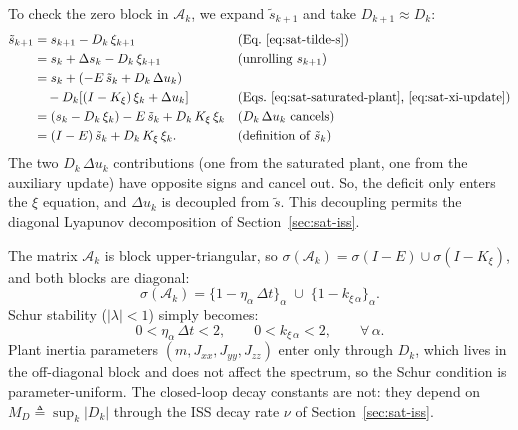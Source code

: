 \documentclass[conf]{new-aiaa}
\begin{document}
To check the zero block in $\mathcal{A}_k$, we expand $\tilde s_{k+1}$ and take $D_{k+1} \approx D_k$:
\small
\begingroup
\setlength{\jot}{1pt}
\begin{align}
\tilde s_{k+1}
&= s_{k+1} - D_k\, \xi_{k+1}
& &\text{(Eq.~\ref{eq:sat-tilde-s})} \notag \\
&= s_k + \Delta s_k - D_k\, \xi_{k+1}
& &\text{(unrolling $s_{k+1}$)} \notag \\
&= s_k + (-E\, \tilde s_k + D_k\, \Delta u_k) \notag \\
&\quad - D_k\!\left[ (I - K_\xi)\, \xi_k + \Delta u_k \right]
& &\text{(Eqs.~\ref{eq:sat-saturated-plant}, \ref{eq:sat-xi-update})} \notag \\
&= (s_k - D_k\, \xi_k) - E\, \tilde s_k + D_k\, K_\xi\, \xi_k
& &\text{($D_k\, \Delta u_k$ cancels)} \notag \\
\label{eq:sat-cancellation}
&= (I - E)\, \tilde s_k + D_k\, K_\xi\, \xi_k.
& &\text{(definition of $\tilde s_k$)}
\end{align}
\endgroup
\normalsize
The two $D_k\, \Delta u_k$ contributions (one from the saturated plant, one from the auxiliary update) have opposite signs and cancel out. So, the deficit only enters the $\xi$ equation, and $\Delta u_k$ is decoupled from $\tilde s$. This decoupling permits the diagonal Lyapunov decomposition of Section~\ref{sec:sat-iss}.

The matrix $\mathcal{A}_k$ is block upper-triangular, so $\sigma(\mathcal{A}_k) = \sigma(I - E) \cup \sigma(I - K_\xi)$, and both blocks are diagonal:
\small
\begin{equation}
\label{eq:sat-spectrum}
\sigma(\mathcal{A}_k) = \{1 - \eta_\alpha\,\Delta t\}_\alpha \;\cup\; \{1 - k_{\xi\, \alpha}\}_\alpha.
\end{equation}
\normalsize
Schur stability ($|\lambda| < 1$) simply becomes:
\begin{equation}
\label{eq:sat-schur}
0 < \eta_\alpha\, \Delta t < 2,
\qquad
0 < k_{\xi\, \alpha} < 2,
\qquad \forall\, \alpha.
\end{equation}
Plant inertia parameters $(m, J_{xx}, J_{yy}, J_{zz})$ enter only through $D_k$, which lives in the off-diagonal block and does not affect the spectrum, so the Schur condition is parameter-uniform. The closed-loop decay constants are not: they depend on $M_D \triangleq \sup_k |D_k|$ through the ISS decay rate $\nu$ of Section~\ref{sec:sat-iss}.
\end{document}
